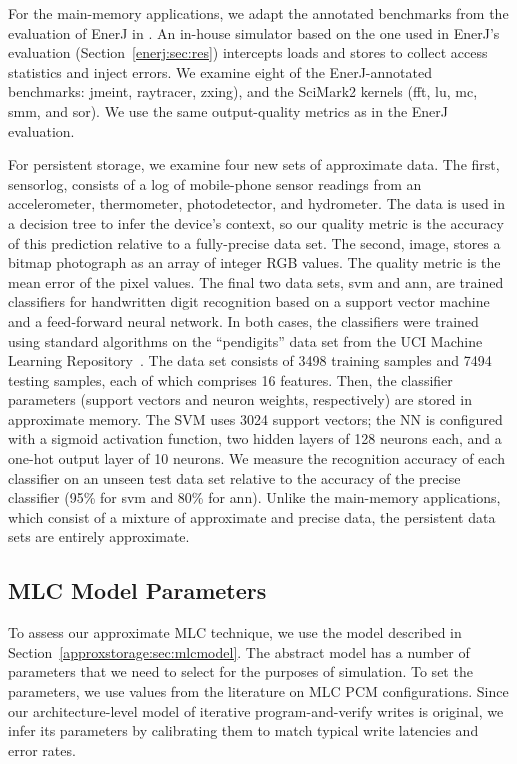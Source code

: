 For the main-memory applications, we adapt the annotated benchmarks
from the evaluation of EnerJ in . An in-house simulator based on the one used in
EnerJ's evaluation (Section~\ref{enerj:sec:res}) intercepts
loads and stores to collect access statistics and inject errors.
We examine eight of the EnerJ-annotated benchmarks:
\textsf{jmeint}, \textsf{raytracer},
\textsf{zxing}), and the SciMark2 kernels (\textsf{fft}, \textsf{lu},
\textsf{mc}, \textsf{smm}, and \textsf{sor}).
We use the same output-quality metrics as in the EnerJ evaluation.

For persistent storage, we examine four new sets of approximate data. The first,
\textsf{sensorlog}, consists of a log of mobile-phone sensor readings from an
accelerometer, thermometer, photodetector, and hydrometer. The data is used in
a decision tree to infer the device's context, so our quality metric is the
accuracy of this prediction relative to a fully-precise data set.
The second, \textsf{image}, stores
a bitmap photograph as an array of integer RGB values. The quality metric is
the mean error of the pixel values.
The final two data sets, \textsf{svm} and \textsf{ann}, are trained
classifiers for handwritten digit recognition based on a support vector
machine and a feed-forward neural network. In both cases,
the classifiers were trained using standard algorithms on the ``pendigits''
data set from the UCI Machine Learning Repository~\cite{ucimlrepo}.
The data set consists of 3498 training samples and 7494 testing samples, each
of which comprises 16 features.
Then, the classifier
parameters (support vectors and neuron weights, respectively) are stored in
approximate memory.
The SVM uses 3024 support vectors; the NN is configured with a sigmoid
activation function, two hidden layers
of 128 neurons each, and a one-hot output layer of 10 neurons.
We measure the recognition accuracy of each classifier on
an unseen test data set relative to the accuracy of the precise classifier
(95\% for \textsf{svm} and 80\% for \textsf{ann}).
Unlike the main-memory applications, which consist of a mixture
of approximate and precise data,
the persistent data sets are entirely
approximate.

\subsection{MLC Model Parameters}
\label{approxstorage:sec:errorparams}

To assess our approximate MLC technique, we use the model described in
Section~\ref{approxstorage:sec:mlcmodel}. The abstract model has a number of parameters that
we need to select for the purposes of simulation. To set the parameters, we use
values from the literature on MLC PCM configurations. Since our
architecture-level model of iterative program-and-verify writes is original, we
infer its parameters by calibrating them to match typical write latencies and error
rates.

